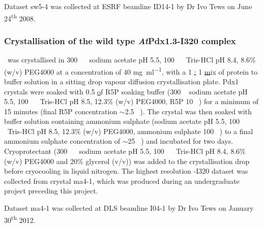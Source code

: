 Dataset sw5-4 was collected at ESRF beamline ID14-1 by Dr Ivo Tews on June 24\textsuperscript{th} 2008. %
		\subsubsection{Crystallisation of the  wild type \textit{At}Pdx1.3-I320 complex}\label{sec:I320crystallisation}
		
\atpdx ~was crystallised in 300 \si{\milli\molar} ~sodium acetate pH 5.5, 100 \si{\milli\molar} ~Tris-HCl pH 8.4,  8.6\% (w/v) PEG4000 at a concentration of 40 \si{\milli\gram\per\milli\litre}, with a 1 \ul : 1 \ul mix of protein to buffer solution in a sitting drop vapour diffusion crystallisation plate. Pdx1 crystals were soaked with 0.5 \ul of R5P soaking buffer (300 \si{\milli\molar} sodium acetate pH 5.5, 100 \si{\milli\molar} ~Tris-HCl pH 8.5, 12.3\% (w/v) PEG4000, R5P 10 \si{\milli\molar}) for a minimum of 15 minutes (final R5P concentration $\sim$2.5 \si{\milli\molar}). The crystal was then soaked with buffer solution containing ammonium sulphate (sodium acetate pH 5.5, 100 \si{\milli\molar} ~Tris-HCl pH 8.5,  12.3\% (w/v) PEG4000, ammonium sulphate 100 \si{\milli\molar}) to a final ammonium sulphate concentration of $\sim$25 \si{\milli\molar}) and incubated for two days. Cryoprotectant (300 \si{\milli\molar} ~sodium acetate pH 5.5, 100 \si{\milli\molar} ~Tris-HCl pH 8.4,  8.6\% (w/v) PEG4000 and 20\% glycerol (v/v)) was added to the crystallisation drop before cryocooling in liquid nitrogen. The highest resolution \atpdx -I320 dataset was collected from crystal ma4-1, which was produced during an undergraduate project preceding this project.    

Dataset ma4-1 was collected at DLS beamline I04-1 by Dr Ivo Tews on January 30\textsuperscript{th} 2012. %

